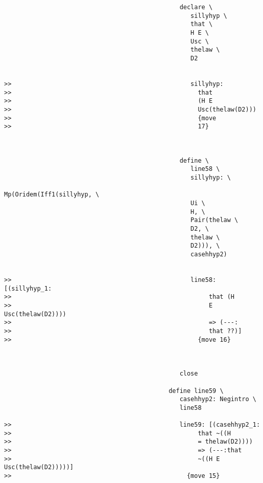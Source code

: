 \documentclass[12pt]{article}
\begin{document}
\begin{verbatim}
                                                declare \
                                                   sillyhyp \
                                                   that \
                                                   H E \
                                                   Usc \
                                                   thelaw \
                                                   D2


>>                                                 sillyhyp:
>>                                                   that
>>                                                   (H E
>>                                                   Usc(thelaw(D2)))
>>                                                   {move
>>                                                   17}



                                                define \
                                                   line58 \
                                                   sillyhyp: \
                                                   Mp(Oridem(Iff1(sillyhyp, \
                                                   Ui \
                                                   H, \
                                                   Pair(thelaw \
                                                   D2, \
                                                   thelaw \
                                                   D2))), \
                                                   casehhyp2)


>>                                                 line58: [(sillyhyp_1:
>>                                                      that (H
>>                                                      E Usc(thelaw(D2))))
>>                                                      => (---:
>>                                                      that ??)]
>>                                                   {move 16}



                                                close

                                             define line59 \
                                                casehhyp2: Negintro \
                                                line58

>>                                              line59: [(casehhyp2_1:
>>                                                   that ~((H
>>                                                   = thelaw(D2))))
>>                                                   => (---:that
>>                                                   ~((H E Usc(thelaw(D2)))))]
>>                                                {move 15}




\end{verbatim}
\end{document}
